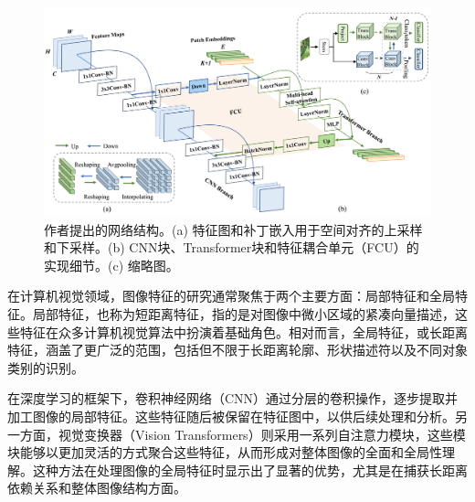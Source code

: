 \documentclass[a4paper]{ctexart}
\begin{document}
	\begin{figure}[htb]
		\centering 
		\includegraphics[width=0.9\columnwidth]{picture/LLIE/Conformer/the proposed Conformer}
		\caption{
			\label{fig: Conformer} 
			作者\cite{peng2021conformer}提出的网络结构。(a) 特征图和补丁嵌入用于空间对齐的上采样和下采样。(b) CNN块、Transformer块和特征耦合单元（FCU）的实现细节。(c) 缩略图。 
		}
	\end{figure}
	
	在计算机视觉领域，图像特征的研究通常聚焦于两个主要方面：局部特征和全局特征。局部特征，也称为短距离特征，指的是对图像中微小区域的紧凑向量描述，这些特征在众多计算机视觉算法中扮演着基础角色\cite{jain1991unsupervised, lowe2004distinctive, ojala2002multiresolution}。相对而言，全局特征，或长距离特征，涵盖了更广泛的范围，包括但不限于长距离轮廓\cite{lisin2005combining}、形状描述符以及不同对象类别的识别。
	
	在深度学习的框架下，卷积神经网络（CNN）通过分层的卷积操作，逐步提取并加工图像的局部特征。这些特征随后被保留在特征图中，以供后续处理和分析。另一方面，视觉变换器（Vision Transformers）则采用一系列自注意力模块，这些模块能够以更加灵活的方式聚合这些特征，从而形成对整体图像的全面和全局性理解。这种方法在处理图像的全局特征时显示出了显著的优势，尤其是在捕获长距离依赖关系和整体图像结构方面。
	
\end{document}
